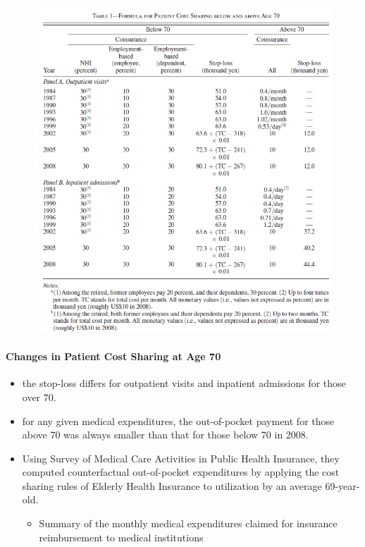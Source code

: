 \documentclass[../root]{subfiles}
\begin{document}
    \begin{figure}[ht]
      \centering
      \includegraphics[scale = 1]{0710tanji/T1}
    \end{figure}

    \paragraph{Changes in Patient Cost Sharing at Age 70}

    \begin{itemize}
      \item the stop-loss differs for outpatient visits and inpatient admissions for those over 70.
      \item for any given medical expenditures, the out-of-pocket payment for those above 70 was always smaller than that for those below 70 in 2008.
      \item Using Survey of Medical Care Activities in Public Health Insurance, they computed counterfactual out-of-pocket expenditures by applying the cost sharing rules of Elderly Health Insurance to utilization by an average 69-year-old.
      \begin{itemize}
        \item Summary of the monthly medical expenditures claimed for insurance reimbursement to medical institutions
      \end{itemize}
    \end{itemize}
\end{document}
